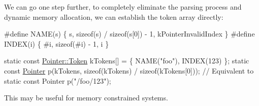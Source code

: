 We can go one step further, to completely eliminate the parsing process and dynamic memory allocation, we can establish the token array directly\+:


\begin{DoxyCode}
\textcolor{preprocessor}{#define NAME(s) \{ s, sizeof(s) / sizeof(s[0]) - 1, kPointerInvalidIndex \}}
\textcolor{preprocessor}{#define INDEX(i) \{ #i, sizeof(#i) - 1, i \}}

\textcolor{keyword}{static} \textcolor{keyword}{const} \hyperlink{struct_generic_pointer_1_1_token}{Pointer::Token} kTokens[] = \{ NAME(\textcolor{stringliteral}{"foo"}), INDEX(123) \};
\textcolor{keyword}{static} \textcolor{keyword}{const} \hyperlink{class_generic_pointer}{Pointer} p(kTokens, \textcolor{keyword}{sizeof}(kTokens) / \textcolor{keyword}{sizeof}(kTokens[0]));
\textcolor{comment}{// Equivalent to static const Pointer p("/foo/123");}
\end{DoxyCode}


This may be useful for memory constrained systems. 